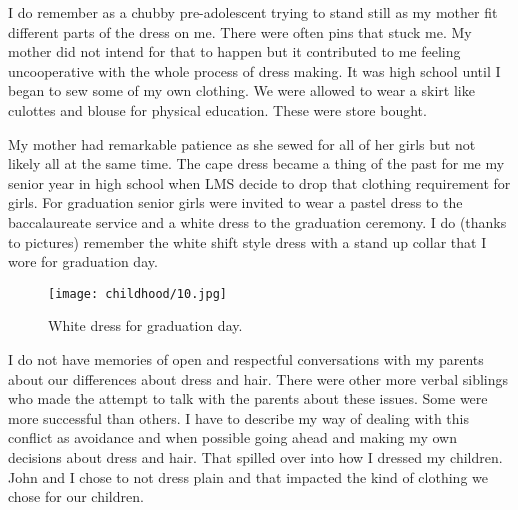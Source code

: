 I do remember as a chubby pre-adolescent trying to stand still as my mother fit different parts of the dress on me.
There were often pins that stuck me.
My mother did not intend for that to happen but it contributed to me feeling uncooperative with the whole process of dress making.
It was high school until I began to sew some of my own clothing.
We were allowed to wear a skirt like culottes and blouse for physical education.
These were store bought.

My mother had remarkable patience as she sewed for all of her girls but not likely all at the same time.
The cape dress became a thing of the past for me my senior year in high school when LMS decide to drop that clothing requirement for girls.
For graduation senior girls were invited to wear a pastel dress to the baccalaureate service and a white dress to the graduation ceremony.
I do (thanks to pictures) remember the white shift style dress with a stand up collar that I wore for graduation day.
\begin{figure}
\centering
\texttt{[image: childhood/10.jpg]}
\caption{
White dress for graduation day.
}
\end{figure}
I do not have memories of open and respectful conversations with my parents about our differences about dress and hair.
There were other more verbal siblings who made the attempt to talk with the parents about these issues.
Some were more successful than others.
I have to describe my way of dealing with this conflict as avoidance and when possible going ahead and making my own decisions about dress and hair.
That spilled over into how I dressed my children.
John and I chose to not dress plain and that impacted the kind of clothing we chose for our children.





